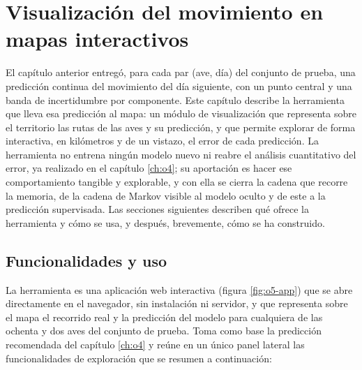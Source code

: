 \chapter{Visualización del movimiento en mapas interactivos}
\label{ch:o5}

El capítulo anterior entregó, para cada par (ave, día) del conjunto de prueba, una
predicción continua del movimiento del día siguiente, con un punto central y una banda
de incertidumbre por componente. Este capítulo describe la herramienta que lleva esa
predicción al mapa: un módulo de visualización que representa sobre el territorio las
rutas de las aves y su predicción, y que permite explorar de forma interactiva, en
kilómetros y de un vistazo, el error de cada predicción. La herramienta no entrena
ningún modelo nuevo ni reabre el análisis cuantitativo del error, ya realizado en el
capítulo \ref{ch:o4}; su aportación es hacer ese comportamiento tangible y explorable,
y con ella se cierra la cadena que recorre la memoria, de la cadena de Markov visible al
modelo oculto y de este a la predicción supervisada. Las secciones siguientes describen
qué ofrece la herramienta y cómo se usa, y después, brevemente, cómo se ha construido.

\section{Funcionalidades y uso}
\label{sec:o5-funcionalidades}

La herramienta es una aplicación web interactiva (figura \ref{fig:o5-app}) que se abre
directamente en el navegador, sin instalación ni servidor, y que representa sobre el mapa
el recorrido real y la predicción del modelo para cualquiera de las ochenta y dos aves
del conjunto de prueba. Toma como base la predicción recomendada del capítulo
\ref{ch:o4} y reúne en un único panel lateral las funcionalidades de exploración que se
resumen a continuación:


